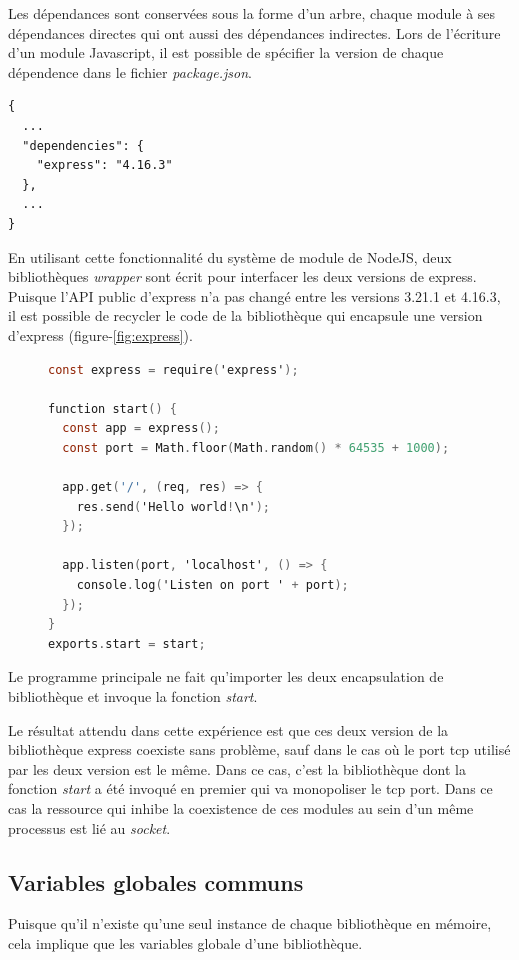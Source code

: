 \documentclass[12pt,initial,twoside,maitrise]{dms}
\numberwithin{equation}{section}
\numberwithin{table}{chapter}
\numberwithin{figure}{chapter}
\begin{document}
Les dépendances sont conservées sous la forme d'un arbre, chaque module à ses dépendances directes
qui ont aussi des dépendances indirectes.  Lors de l'écriture d'un module Javascript, il est possible
de spécifier la version de chaque dépendence dans le fichier \textit{package.json}.
\begin{verbatim}
{
  ...
  "dependencies": {
    "express": "4.16.3"
  },
  ...
}
\end{verbatim}
En utilisant cette fonctionnalité du système de module de NodeJS, deux bibliothèques \textit{wrapper}
sont écrit pour interfacer les deux versions de express. Puisque l'API public d'express n'a pas changé entre
les versions 3.21.1 et 4.16.3, il est possible de recycler le code de la bibliothèque qui encapsule une
version d'express (figure-\ref{fig:express}).
\begin{center}
\begin{figure}[ht]
    \begin{lstlisting}[language=C,frame=single]
const express = require('express');

function start() {
  const app = express();
  const port = Math.floor(Math.random() * 64535 + 1000);

  app.get('/', (req, res) => {
    res.send('Hello world!\n');
  });

  app.listen(port, 'localhost', () => {
    console.log('Listen on port ' + port);
  });
}
exports.start = start;
\end{lstlisting}
\end{figure}
\label{fig:express}
\end{center}
Le programme principale ne fait qu'importer les deux encapsulation de bibliothèque
et invoque la fonction \textit{start}.

Le résultat attendu dans cette expérience est que ces deux version de la bibliothèque
express coexiste sans problème, sauf dans le cas où le port tcp utilisé par les deux
version est le même. Dans ce cas, c'est la bibliothèque dont la fonction
\textit{start} a été invoqué en premier qui va monopoliser le tcp port. Dans ce cas
la ressource qui inhibe la coexistence de ces modules au sein d'un même processus
est lié au \textit{socket}.

\subsection{Variables globales communs}

Puisque qu'il n'existe qu'une seul instance de chaque bibliothèque en mémoire, cela implique
que les variables globale d'une bibliothèque.
\end{document}
